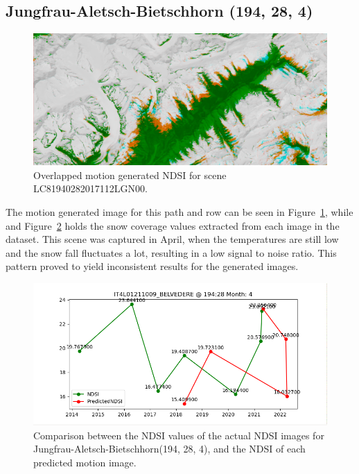\documentclass[12pt, a4paper]{report}
\begin{document}
	\subsection{Jungfrau-Aletsch-Bietschhorn (194, 28, 4)}
	
	\begin{figure}[h!]
		\centering
		\includegraphics[width=\linewidth]{../images/experiment_1940284_image.png}
		\caption{Overlapped motion generated NDSI for scene LC81940282017112LGN00.}
		\label{fig:experiment_1940284_image}
	\end{figure}

	The motion generated image for this path and row can be seen in Figure~\ref{fig:experiment_1940284_image}, while and Figure~\ref{fig:jungfrau_194284} holds the snow coverage values extracted from each image in the dataset. This scene was captured in April, when the temperatures are still low and the snow fall fluctuates a lot, resulting in a low signal to noise ratio. This pattern proved to yield inconsistent results for the generated images.
	
	\begin{figure}[h!]
		\centering
		\includegraphics[scale=0.5]{../images/experiment_194284.png}
		\caption{Comparison between the NDSI values of the actual NDSI images for Jungfrau-Aletsch-Bietschhorn(194, 28, 4), and the NDSI of each predicted motion image.}
		\label{fig:jungfrau_194284}
	\end{figure}
\end{document}

